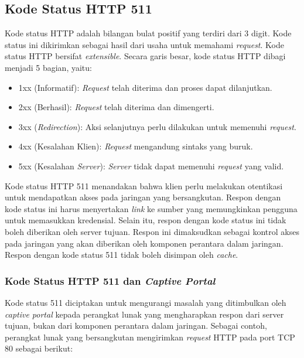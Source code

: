 \subsection{Kode Status HTTP 511}
\label{subsec:http_511}

Kode status HTTP adalah bilangan bulat positif yang terdiri dari 3 digit\cite{IETF_HTTP:2016}. Kode status ini dikirimkan sebagai hasil dari usaha untuk memahami \textit{request}. Kode status HTTP bersifat \textit{extensible}. Secara garis besar, kode status HTTP dibagi menjadi 5 bagian, yaitu:

\begin{itemize}
    \item{1xx (Informatif): \textit{Request} telah diterima dan proses dapat dilanjutkan.}
    \item{2xx (Berhasil): \textit{Request} telah diterima dan dimengerti.}
    \item{3xx (\textit{Redirection}): Aksi selanjutnya perlu dilakukan untuk memenuhi \textit{request}.}
    \item{4xx (Kesalahan Klien): \textit{Request} mengandung sintaks yang buruk.}
    \item{5xx (Kesalahan \textit{Server}): \textit{Server} tidak dapat memenuhi \textit{request} yang valid.}
\end{itemize}

Kode status HTTP 511 menandakan bahwa klien perlu melakukan otentikasi untuk mendapatkan akses pada jaringan yang bersangkutan\cite{IETF_HTTP_AdditionalStatus:2016}. Respon dengan kode status ini harus menyertakan \textit{link} ke sumber yang memungkinkan pengguna untuk memasukkan kredensial. Selain itu, respon dengan kode status ini tidak boleh diberikan oleh server tujuan. Respon ini dimaksudkan sebagai kontrol akses pada jaringan yang akan diberikan oleh komponen perantara dalam jaringan. Respon dengan kode status 511 tidak boleh disimpan oleh \textit{cache}.

\subsubsection{Kode Status HTTP 511 dan \textit{Captive Portal}}
\label{subsubsec:http_511_and_captive_portal}

Kode status 511 diciptakan untuk mengurangi masalah yang ditimbulkan oleh \textit{captive portal} kepada perangkat lunak yang mengharapkan respon dari server tujuan, bukan dari komponen perantara dalam jaringan. Sebagai contoh, perangkat lunak yang bersangkutan mengirimkan \textit{request} HTTP pada port TCP 80 sebagai berikut:

